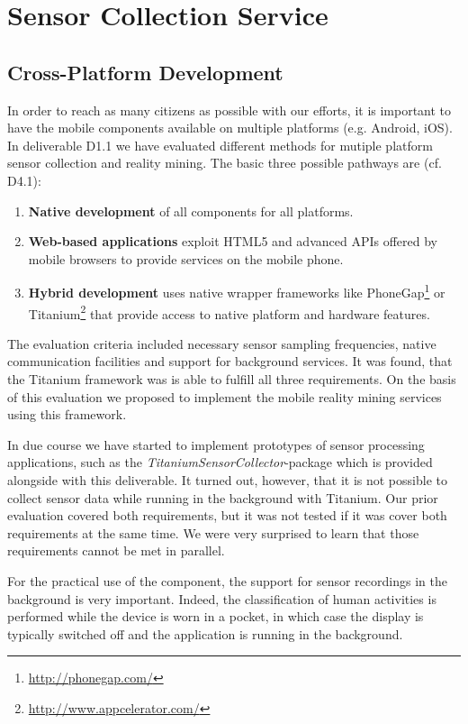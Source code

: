 \documentclass[external]{20120615_deliverable_template_ukob}
\theoremstyle{definition}
\begin{document}
\clearpage
\chapter{Sensor Collection Service}
\label{chap:sc}


\clearpage
\section{Cross-Platform Development}
\label{sec:cross_platform}

In order to reach as many citizens as possible with our efforts, it is
important to have the mobile components available on multiple
platforms (e.g. Android, iOS). In deliverable D1.1 we have evaluated
different methods for mutiple platform sensor collection and reality
mining. The basic three possible pathways are (cf. D4.1):
\begin{enumerate}
\item {\bf Native development} of all components for all platforms.
\item {\bf Web-based applications} exploit HTML5 and advanced APIs
  offered by mobile browsers to provide services on the mobile phone.
\item {\bf Hybrid development} uses native wrapper frameworks like
  PhoneGap\footnote{\url{http://phonegap.com/}} or
  Titanium\footnote{\url{http://www.appcelerator.com/}} that provide
  access to native platform and hardware features.
\end{enumerate}

The evaluation criteria included necessary sensor sampling
frequencies, native communication facilities and support for
background services. It was found, that the Titanium framework was
is able to fulfill all three requirements. On the basis of this
evaluation we proposed to implement the mobile reality mining 
services using this framework.

In due course we have started to implement prototypes of sensor
processing applications, such as the {\it
  TitaniumSensorCollector}-package which is provided alongside with
this deliverable.  It turned out, however, that it is not possible to
collect sensor data while running in the background with Titanium. Our
prior evaluation covered both requirements, but it was not tested if
it was cover both requirements at the same time. We were very
surprised to learn that those requirements cannot be met in parallel.

For the practical use of the component, the support for sensor
recordings in the background is very important. Indeed, the
classification of human activities is performed while the device is
worn in a pocket, in which case the display is typically switched
off and the application is running in the background.
\end{document}
